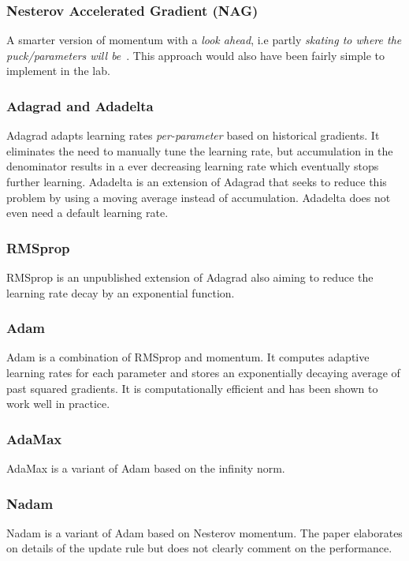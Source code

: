 \documentclass[a4paper]{article}
\begin{document}
\subsubsection{Nesterov Accelerated Gradient (NAG)}
A smarter version of momentum with a \emph{look ahead}, i.e partly \emph{skating to where the puck/parameters will be}~\cite{hinton_slides_2012}. 
This approach would also have been fairly simple to implement in the lab.

\subsubsection{Adagrad and Adadelta}
Adagrad adapts learning rates \emph{per-parameter} based on historical gradients. It eliminates the need to manually tune the learning rate, but accumulation in the denominator results in a ever decreasing learning rate which eventually stops further learning. Adadelta is an extension of Adagrad that seeks to reduce this problem by using a moving average instead of accumulation. Adadelta does not even need a default learning rate.


\subsubsection{RMSprop}
RMSprop is an unpublished extension of Adagrad also aiming to reduce the learning rate decay by an exponential function. 

\subsubsection{Adam}
Adam is a combination of RMSprop and momentum. It computes adaptive learning rates for each parameter and stores an exponentially decaying average of past squared gradients. It is computationally efficient and has been shown to work well in practice.

\subsubsection{AdaMax}
AdaMax is a variant of Adam based on the infinity norm.

\subsubsection{Nadam}
Nadam is a variant of Adam based on Nesterov momentum. The paper elaborates on details of the update rule but does not clearly comment on the performance. 
\end{document}
